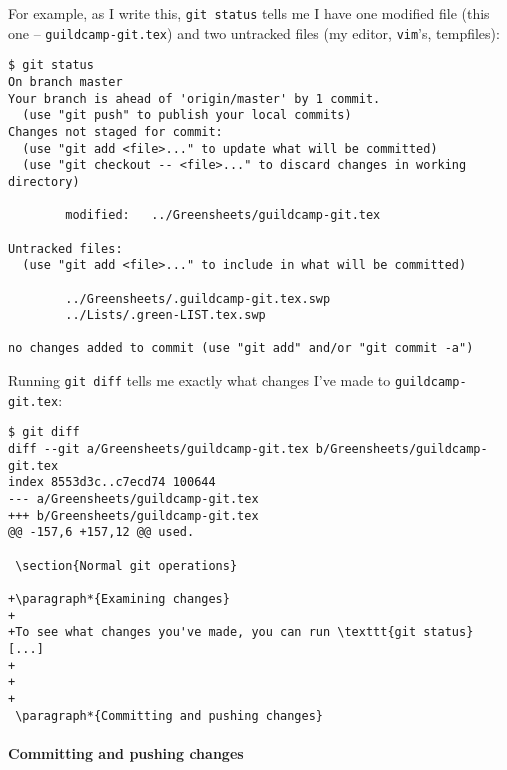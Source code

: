 \documentclass[green]{testgame}
\begin{document}
For example, as I write this, \texttt{git status} tells me I have one modified file (this one -- \texttt{guildcamp-git.tex}) and two untracked files (my editor, \texttt{vim}'s, tempfiles):
\begin{verbatim}
$ git status
On branch master
Your branch is ahead of 'origin/master' by 1 commit.
  (use "git push" to publish your local commits)
Changes not staged for commit:
  (use "git add <file>..." to update what will be committed)
  (use "git checkout -- <file>..." to discard changes in working directory)

        modified:   ../Greensheets/guildcamp-git.tex

Untracked files:
  (use "git add <file>..." to include in what will be committed)

        ../Greensheets/.guildcamp-git.tex.swp
        ../Lists/.green-LIST.tex.swp

no changes added to commit (use "git add" and/or "git commit -a")
\end{verbatim}

Running \texttt{git diff} tells me exactly what changes I've made to \texttt{guildcamp-git.tex}:
\begin{verbatim}
$ git diff
diff --git a/Greensheets/guildcamp-git.tex b/Greensheets/guildcamp-git.tex
index 8553d3c..c7ecd74 100644
--- a/Greensheets/guildcamp-git.tex
+++ b/Greensheets/guildcamp-git.tex
@@ -157,6 +157,12 @@ used.

 \section{Normal git operations}

+\paragraph*{Examining changes}
+
+To see what changes you've made, you can run \texttt{git status} [...]
+
+
+
 \paragraph*{Committing and pushing changes}
\end{verbatim}

\paragraph*{Committing and pushing changes}


\end{document}
